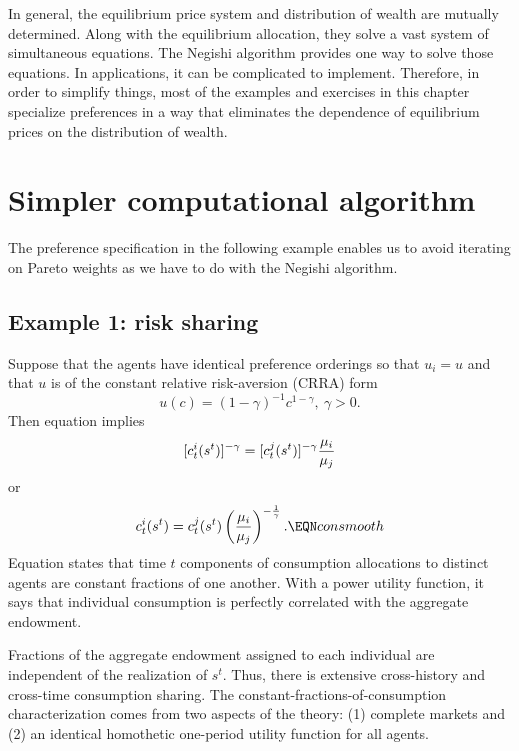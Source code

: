In general, the equilibrium price system and distribution of wealth are mutually determined. Along with the equilibrium allocation, they solve
a vast system of simultaneous equations.  The Negishi algorithm provides one way to solve those equations.
In applications, it can be complicated to implement.  Therefore, in order to simplify things,
  most of the examples and exercises in this chapter specialize  preferences
in a way that eliminates the dependence of equilibrium prices on the distribution of wealth.







\section{Simpler computational algorithm}
The preference specification in the following example enables us to avoid iterating on Pareto weights as we have to do with 
the Negishi algorithm.
\subsection{Example 1: risk sharing}\label{sec:ex1_risksharing}%
\noindent Suppose that the agents have identical preference orderings so that $u_i = u$ and that
$u$ is of the constant
relative risk-aversion (CRRA) form
$$ u(c) = (1-\gamma)^{-1} c^{1-\gamma} , \ \gamma > 0.$$
Then equation  implies
$$ [c_t^i(s^t)]^{-\gamma}
   = [c_t^j(s^t)]^{-\gamma} {\mu_i \over \mu_j} $$
or
$$ c_t^i(s^t) = c_t^j(s^t) \left({\mu_i \over \mu_j}\right)^{-{1 \over  \gamma}}.
    \EQN consmooth $$
Equation  states that time $t$ components
of consumption allocations  to
distinct agents are
constant fractions of one another. With a power utility function,
 it says that  individual
consumption is perfectly correlated with the aggregate endowment.   

Fractions  of the aggregate endowment assigned to each
individual are independent of the realization of $s^t$.    Thus,
there is extensive cross-history and cross-time consumption
sharing. The constant-fractions-of-consumption characterization
comes from two aspects of the theory: (1) complete markets
and (2) an identical  homothetic one-period utility function for all agents.


